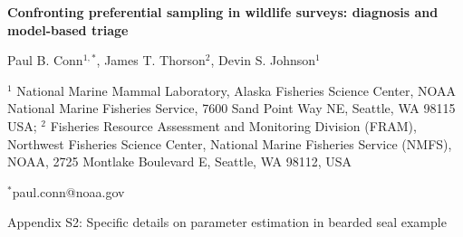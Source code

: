 \documentclass[times,mee,doublespace,]{besauth2}
\begin{document}
\begin{center} \bf {\large Confronting preferential sampling in wildlife surveys: diagnosis and model-based triage}

\rm
\vspace{0.7cm}
Paul B. Conn$^{1,*}$, James T. Thorson$^2$, Devin S. Johnson$^1$
\end{center}
\vspace{0.5cm}

\rm
\small


$^1$ National Marine Mammal Laboratory, Alaska Fisheries Science Center, NOAA National Marine Fisheries Service, 7600 Sand Point Way NE, Seattle, WA 98115 USA; $^2$ Fisheries Resource Assessment and Monitoring Division (FRAM), Northwest Fisheries Science Center, National Marine Fisheries Service (NMFS),
NOAA, 2725 Montlake Boulevard E, Seattle, WA 98112, USA

$^*$paul.conn@noaa.gov

\large
\bigskip
\centerline{Appendix S2: Specific details on parameter estimation in bearded seal example}
\bigskip
\small

\linenumbers

\def\VAR{{\rm Var}\,}
\def\COV{{\rm Cov}\,}
\def\Prob{{\rm P}\,}
\end{document}
